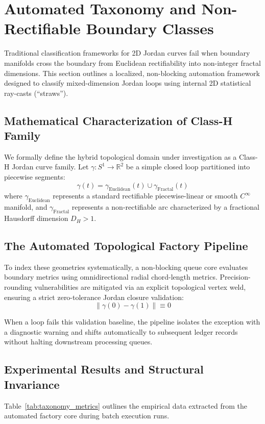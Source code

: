 \section{Automated Taxonomy and Non-Rectifiable Boundary Classes}
\label{sec:automated_taxonomy}

Traditional classification frameworks for 2D Jordan curves fail when boundary manifolds cross the boundary from Euclidean rectifiability into non-integer fractal dimensions. This section outlines a localized, non-blocking automation framework designed to classify mixed-dimension Jordan loops using internal 2D statistical ray-casts (``straws'').

\subsection{Mathematical Characterization of Class-H Family}
We formally define the hybrid topological domain under investigation as a Class-H Jordan curve family. Let $\gamma: S^1 \to \mathbb{R}^2$ be a simple closed loop partitioned into piecewise segments:
\begin{equation}
    \gamma(t) = \gamma_{\text{Euclidean}}(t) \cup \gamma_{\text{Fractal}}(t)
\end{equation}
where $\gamma_{\text{Euclidean}}$ represents a standard rectifiable piecewise-linear or smooth $C^\infty$ manifold, and $\gamma_{\text{Fractal}}$ represents a non-rectifiable arc characterized by a fractional Hausdorff dimension $D_H > 1$.

\subsection{The Automated Topological Factory Pipeline}
To index these geometries systematically, a non-blocking queue core evaluates boundary metrics using omnidirectional radial chord-length metrics. Precision-rounding vulnerabilities are mitigated via an explicit topological vertex weld, ensuring a strict zero-tolerance Jordan closure validation:
\begin{equation}
    \|\gamma(0) - \gamma(1)\| \equiv 0
\end{equation}

When a loop fails this validation baseline, the pipeline isolates the exception with a diagnostic warning and shifts automatically to subsequent ledger records without halting downstream processing queues.

\subsection{Experimental Results and Structural Invariance}
Table~\ref{tab:taxonomy_metrics} outlines the empirical data extracted from the automated factory core during batch execution runs.

